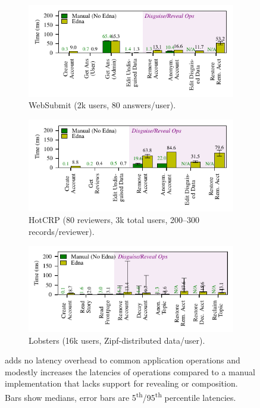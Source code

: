 \begin{figure}[t]
  \centering
  \begin{subfigure}[b]{\columnwidth}
      \includegraphics[width=\columnwidth]{figs/websubmit_op_stats}
    \caption{WebSubmit (2k users, 80 answers/user).}
    \label{f:ops-websubmit}
  \end{subfigure}
  \begin{subfigure}[b]{\columnwidth}
    \includegraphics{figs/hotcrp_op_stats}
      \caption{HotCRP (80 reviewers, 3k total users, 200--300 records/reviewer).}
    \label{f:ops-hotcrp}
  \end{subfigure}
  \begin{subfigure}[b]{\columnwidth}
    \includegraphics{figs/lobsters_op_stats}
    \caption{Lobsters (16k users, Zipf-distributed data/user).}
    \label{f:ops-lobsters}
  \end{subfigure}
  \caption{\sys adds no latency overhead to common application operations and
  modestly increases the latencies of \xxing operations compared to a manual
  implementation that lacks support for revealing or composition.
  Bars show medians, error bars are 5\textsuperscript{th}/95\textsuperscript{th}
  percentile latencies.}
  \label{fig:client_opstats}
\end{figure}

